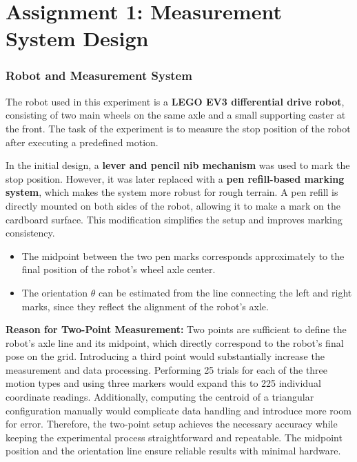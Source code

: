 

\part{Assignment 1: Measurement System Design}
\setcounter{section}{0}

\section{Robot and Measurement System}

The robot used in this experiment is a \textbf{LEGO EV3 differential drive robot}, consisting of two main wheels on the same axle and a small supporting caster at the front. The task of the experiment is to measure the stop position of the robot after executing a predefined motion.

In the initial design, a \textbf{lever and pencil nib mechanism} was used to mark the stop position. However, it was later replaced with a \textbf{pen refill-based marking system}, which makes the system more robust for rough terrain. A pen refill is directly mounted on both sides of the robot, allowing it to make a mark on the cardboard surface. This modification simplifies the setup and improves marking consistency.

\begin{itemize}
    \item The midpoint between the two pen marks corresponds approximately to the final position of the robot's wheel axle center.
    \item The orientation $\theta$ can be estimated from the line connecting the left and right marks, since they reflect the alignment of the robot's axle.
\end{itemize}

\textbf{Reason for Two-Point Measurement:}  
Two points are sufficient to define the robot's axle line and its midpoint, which directly correspond to the robot's final pose on the grid. Introducing a third point would substantially increase the measurement and data processing. Performing 25 trials for each of the three motion types and using three markers would expand this to 225 individual coordinate readings. Additionally, computing the centroid of a triangular configuration manually would complicate data handling and introduce more room for error. Therefore, the two-point setup achieves the necessary accuracy while keeping the experimental process straightforward and repeatable. The midpoint position and the orientation line ensure reliable results with minimal hardware.

